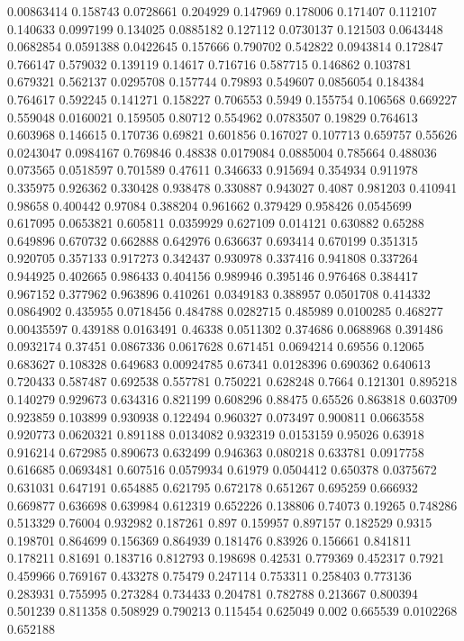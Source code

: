 0.00863414 0.158743
0.0728661 0.204929
0.147969 0.178006
0.171407 0.112107
0.140633 0.0997199
0.134025 0.0885182
0.127112 0.0730137
0.121503 0.0643448
0.0682854 0.0591388
0.0422645 0.157666
0.790702 0.542822
0.0943814 0.172847
0.766147 0.579032
0.139119 0.14617
0.716716 0.587715
0.146862 0.103781
0.679321 0.562137
0.0295708 0.157744
0.79893 0.549607
0.0856054 0.184384
0.764617 0.592245
0.141271 0.158227
0.706553 0.5949
0.155754 0.106568
0.669227 0.559048
0.0160021 0.159505
0.80712 0.554962
0.0783507 0.19829
0.764613 0.603968
0.146615 0.170736
0.69821 0.601856
0.167027 0.107713
0.659757 0.55626
0.0243047 0.0984167
0.769846 0.48838
0.0179084 0.0885004
0.785664 0.488036
0.073565 0.0518597
0.701589 0.47611
0.346633 0.915694
0.354934 0.911978
0.335975 0.926362
0.330428 0.938478
0.330887 0.943027
0.4087 0.981203
0.410941 0.98658
0.400442 0.97084
0.388204 0.961662
0.379429 0.958426
0.0545699 0.617095
0.0653821 0.605811
0.0359929 0.627109
0.014121 0.630882
0.65288 0.649896
0.670732 0.662888
0.642976 0.636637
0.693414 0.670199
0.351315 0.920705
0.357133 0.917273
0.342437 0.930978
0.337416 0.941808
0.337264 0.944925
0.402665 0.986433
0.404156 0.989946
0.395146 0.976468
0.384417 0.967152
0.377962 0.963896
0.410261 0.0349183
0.388957 0.0501708
0.414332 0.0864902
0.435955 0.0718456
0.484788 0.0282715
0.485989 0.0100285
0.468277 0.00435597
0.439188 0.0163491
0.46338 0.0511302
0.374686 0.0688968
0.391486 0.0932174
0.37451 0.0867336
0.0617628 0.671451
0.0694214 0.69556
0.12065 0.683627
0.108328 0.649683
0.00924785 0.67341
0.0128396 0.690362
0.640613 0.720433
0.587487 0.692538
0.557781 0.750221
0.628248 0.7664
0.121301 0.895218
0.140279 0.929673
0.634316 0.821199
0.608296 0.88475
0.65526 0.863818
0.603709 0.923859
0.103899 0.930938
0.122494 0.960327
0.073497 0.900811
0.0663558 0.920773
0.0620321 0.891188
0.0134082 0.932319
0.0153159 0.95026
0.63918 0.916214
0.672985 0.890673
0.632499 0.946363
0.080218 0.633781
0.0917758 0.616685
0.0693481 0.607516
0.0579934 0.61979
0.0504412 0.650378
0.0375672 0.631031
0.647191 0.654885
0.621795 0.672178
0.651267 0.695259
0.666932 0.669877
0.636698 0.639984
0.612319 0.652226
0.138806 0.74073
0.19265 0.748286
0.513329 0.76004
0.932982 0.187261
0.897 0.159957
0.897157 0.182529
0.9315 0.198701
0.864699 0.156369
0.864939 0.181476
0.83926 0.156661
0.841811 0.178211
0.81691 0.183716
0.812793 0.198698
0.42531 0.779369
0.452317 0.7921
0.459966 0.769167
0.433278 0.75479
0.247114 0.753311
0.258403 0.773136
0.283931 0.755995
0.273284 0.734433
0.204781 0.782788
0.213667 0.800394
0.501239 0.811358
0.508929 0.790213
0.115454 0.625049
0.002 0.665539
0.0102268 0.652188
